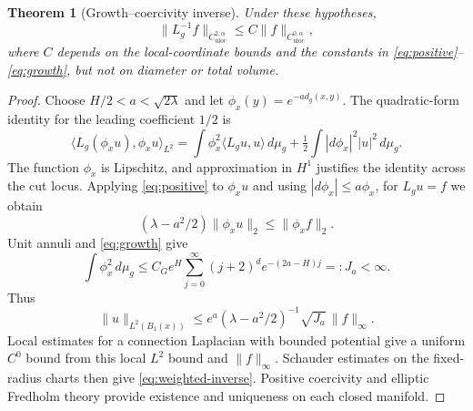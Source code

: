 \documentclass[11pt,a4paper]{article}
\newtheorem{theorem}{Theorem}[section]
\theoremstyle{definition}\newtheorem{definition}[theorem]{Definition}
\theoremstyle{remark}\newtheorem{remark}[theorem]{Remark}
\newcommand{\uloc}{\mathrm{uloc}}
\newcommand{\dd}{\,d\mu_g}
\begin{document}
\begin{theorem}[Growth--coercivity inverse]\label{thm:weighted}
Under these hypotheses,
\begin{equation}\label{eq:weighted-inverse}
 \|L_g^{-1}f\|_{C^{2,\alpha}_{\uloc}}
                   \le C\|f\|_{C^{0,\alpha}_{\uloc}},
\end{equation}
where $C$ depends on the local-coordinate bounds and the constants in \eqref{eq:positive}--\eqref{eq:growth}, but not on diameter or total volume.
\end{theorem}
\begin{proof}
Choose $H/2<a<\sqrt{2\lambda}$ and let $\phi_x(y)=e^{-ad_g(x,y)}$. The quadratic-form identity for the leading coefficient $1/2$ is
\begin{equation}\label{eq:IMS}
 \langle L_g(\phi_xu),\phi_xu\rangle_{L^2}
 =\int\phi_x^2\langle L_gu,u\rangle\dd
                          +\tfrac12\int|d\phi_x|^2|u|^2\dd.
\end{equation}
The function $\phi_x$ is Lipschitz, and approximation in $H^1$ justifies the identity across the cut locus. Applying \eqref{eq:positive} to $\phi_xu$ and using $|d\phi_x|\le a\phi_x$, for $L_gu=f$ we obtain
\begin{equation}\label{eq:weightedL2}
 (\lambda-a^2/2)\|\phi_xu\|_2
                             \le\|\phi_xf\|_2.
\end{equation}
Unit annuli and \eqref{eq:growth} give
\[
 \int\phi_x^2\dd\le C_Ge^H\sum_{j=0}^{\infty}
                      (j+2)^d e^{-(2a-H)j}=:J_a<\infty.
\]
Thus
\[
 \|u\|_{L^2(B_1(x))}
 \le e^a(\lambda-a^2/2)^{-1}\sqrt{J_a}\,\|f\|_\infty.
\]
Local estimates for a connection Laplacian with bounded potential give a uniform $C^0$ bound from this local $L^2$ bound and $\|f\|_\infty$. Schauder estimates on the fixed-radius charts then give \eqref{eq:weighted-inverse}. Positive coercivity and elliptic Fredholm theory provide existence and uniqueness on each closed manifold.
\end{proof}
\end{document}
